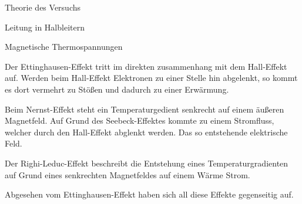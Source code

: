 \documentclass[pdftex, a4paper,11pt, twoside, ngerman]{report}
\begin{document}
\begin{chapter}{Theorie des Versuchs}
\begin{section}{Leitung in Halbleitern}
\begin{subsection}{Magnetische Thermospannungen}

                Der Ettinghausen-Effekt tritt im direkten zusammenhang mit dem Hall-Effekt auf.
                Werden beim Hall-Effekt Elektronen zu einer Stelle hin abgelenkt, so kommt es dort vermehrt zu Stößen und dadurch zu einer Erwärmung.
                
                Beim Nernst-Effekt steht ein Temperaturgedient senkrecht auf einem äußeren Magnetfeld.
                Auf Grund des Seebeck-Effektes kommte zu einem Stromfluss, welcher durch den Hall-Effekt abglenkt werden.
                Das so entstehende elektrische Feld.


                Der Righi-Leduc-Effekt beschreibt die Entstehung eines Temperaturgradienten auf Grund eines senkrechten Magnetfeldes auf einem Wärme Strom.

                Abgesehen vom Ettinghausen-Effekt haben sich all diese Effekte gegenseitig auf.

        \end{subsection}

    \end{section}
    
    
  \end{chapter}
         
         
         
\end{document}
